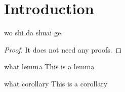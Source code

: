 \documentclass{PlainNote}
\begin{document}
\thispagestyle{empty}
\maketitle


\begin{abstract}


  This is a PDF powered by \LaTeX. I will never teach you how to use it unless you know.

\end{abstract}


\section{Introduction}

\begin{theorem}{1}
wo shi da shuai ge.
\tcblower
\begin{proof}{1}
It does not need any proofs.
\end{proof}
\end{theorem}

\begin{lemma}{what lemma}
This is a lemma
\end{lemma}

\begin{corollary}{what corollary}
This is a corollary
\end{corollary}
\end{document}

